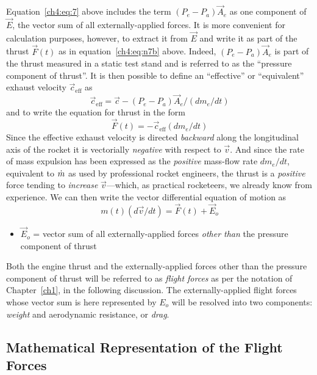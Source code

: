 Equation~\eqref{ch4:eq:7} above includes the term $(P_e - P_a)\vec{A}_e$ as one component of
$\vec{E}$, the vector sum of all externally-applied forces. It is more convenient for calculation
purposes, however, to extract it from $\vec{E}$ and write it as part of the thrust $\vec{F}(t)$ as
in equation~\eqref{ch4:eq:n7b} above. Indeed, $(P_e - P_a)\vec{A}_e$ is part of the thrust
measured in a static test stand and is referred to as the ``pressure component of thrust''. It is
then possible to define an ``effective'' or ``equivalent'' exhaust velocity $\vec{c}_{\mathrm{eff}}$
as
\begin{equation*}\tag{7c}\label{ch4:eq:n7c}
\vec{c}_{\mathrm{eff}} = \vec{c} - (P_e - P_a)\vec{A}_e/(dm_e/dt)
\end{equation*}
and to write the equation for thrust in the form
\begin{equation*}\tag{7d}\label{ch4:eq:n7d}
\vec{F}(t) = -\vec{c}_{\mathrm{eff}}(dm_e/dt)
\end{equation*}
Since the effective exhaust velocity is directed \emph{backward} along the longitudinal axis of
the rocket it is vectorially \emph{negative} with respect to $\vec{v}$. And since the rate of mass
expulsion has been expressed as the \emph{positive} mass-flow rate $dm_e/dt$, equivalent to
$\dot{m}$ as used by professional rocket engineers, the thrust is a \emph{positive} force tending to
\emph{increase} $\vec{v}$---which, as practical rocketeers, we already know from experience. We can
then write the vector differential equation of motion as
\begin{equation}\label{ch4:eq:8}
m(t)(d\vec{v}/dt) = \vec{F}(t) + \vec{E}_o
\end{equation}
\begin{itemize}[nosep,leftmargin=4em,labelwidth=3.5em,labelsep=0.5em,align=left]
  \item[Where] $\vec{E}_o$ = vector sum of all externally-applied forces \emph{other than} the pressure
    component of thrust
\end{itemize}
Both the engine thrust and the externally-applied forces other than the pressure component of
thrust will be referred to as \emph{flight forces} as per the notation of Chapter~\ref{ch1}, in
the following discussion. The externally-applied flight forces whose vector sum is here
represented by $E_o$ will be resolved into two components: \emph{weight} and aerodynamic
resistance, or \emph{drag}.

\subsection{Mathematical Representation of the Flight Forces}\label{ch4:sec:1.1}

